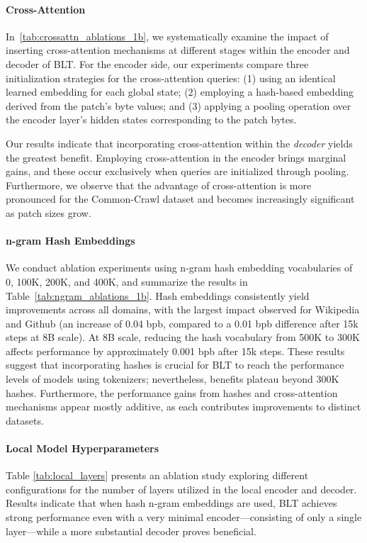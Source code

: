 \paragraph{Cross-Attention} 
In~\autoref{tab:crossattn_ablations_1b}, we systematically examine the impact of inserting cross-attention mechanisms at different stages within the encoder and decoder of {\textsc BLT}. For the encoder side, our experiments compare three initialization strategies for the cross-attention queries: (1) using an identical learned embedding for each global state; (2) employing a hash-based embedding derived from the patch's byte values; and (3) applying a pooling operation over the encoder layer's hidden states corresponding to the patch bytes.

Our results indicate that incorporating cross-attention within the \textit{decoder} yields the greatest benefit. Employing cross-attention in the encoder brings marginal gains, and these occur exclusively when queries are initialized through pooling. Furthermore, we observe that the advantage of cross-attention is more pronounced for the Common-Crawl dataset and becomes increasingly significant as patch sizes grow.

\paragraph{n-gram Hash Embeddings} 

We conduct ablation experiments using n-gram hash embedding vocabularies of 0, 100K, 200K, and 400K, and summarize the results in Table~\ref{tab:ngram_ablations_1b}. Hash embeddings consistently yield improvements across all domains, with the largest impact observed for Wikipedia and Github (an increase of 0.04 bpb, compared to a 0.01 bpb difference after 15k steps at 8B scale). At 8B scale, reducing the hash vocabulary from 500K to 300K affects performance by approximately 0.001 bpb after 15k steps. These results suggest that incorporating hashes is crucial for {\textsc BLT} to reach the performance levels of models using tokenizers; nevertheless, benefits plateau beyond 300K hashes. Furthermore, the performance gains from hashes and cross-attention mechanisms appear mostly additive, as each contributes improvements to distinct datasets.

\paragraph{Local Model Hyperparameters} Table \ref{tab:local_layers} presents an ablation study exploring different configurations for the number of layers utilized in the local encoder and decoder. Results indicate that when hash n-gram embeddings are used, {\textsc BLT} achieves strong performance even with a very minimal encoder—consisting of only a single layer—while a more substantial decoder proves beneficial.

